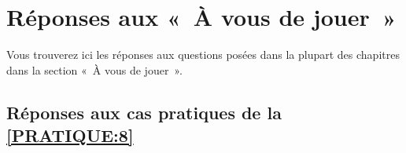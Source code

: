 

\chapter{Réponses aux «~À vous de jouer~»\label{annexe:reponses}}


Vous trouverez ici les réponses aux questions posées dans la plupart des chapitres dans la section «~À vous de jouer~». 

\section{Réponses aux cas pratiques de la \autoref{PRATIQUE:8}\label{REPONSES:8}}
